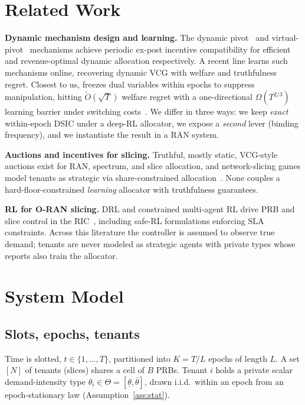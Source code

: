 \documentclass[conference]{IEEEtran}
\theoremstyle{definition}
\theoremstyle{remark}
\newcommand{\Slots}{T}
\newcommand{\Ep}{L}
\newcommand{\Neps}{K}
\newcommand{\Ntn}{N}
\newcommand{\type}{\theta}
\newcommand{\typesp}{\Theta}
\newcommand{\Otil}{\tilde{O}}
\begin{document}
\section{Related Work}\label{sec:related}
\textbf{Dynamic mechanism design and learning.} The dynamic pivot~\cite{ref:bergemann} and virtual-pivot~\cite{ref:kakade} mechanisms achieve periodic ex-post incentive compatibility for efficient and revenue-optimal dynamic allocation respectively. A recent line learns such mechanisms online, recovering dynamic VCG with welfare and truthfulness regret. Closest to us, \cite{ref:dai} freezes dual variables within epochs to suppress manipulation, hitting $\Otil(\sqrt{\Slots})$ welfare regret with a one-directional $\Omega(\Slots^{2/3})$ learning barrier under switching costs~\cite{ref:dekel}. We differ in three ways: we keep \emph{exact} within-epoch DSIC under a deep-RL allocator, we expose a \emph{second} lever (binding frequency), and we instantiate the result in a RAN system.

\textbf{Auctions and incentives for slicing.} Truthful, mostly static, VCG-style auctions exist for RAN, spectrum, and slice allocation, and network-slicing games model tenants as strategic via share-constrained allocation~\cite{ref:slicinggames}. None couples a hard-floor-constrained \emph{learning} allocator with truthfulness guarantees.

\textbf{RL for O-RAN slicing.} DRL and constrained multi-agent RL drive PRB and slice control in the RIC~\cite{ref:coloran,ref:slicing}, including safe-RL formulations enforcing SLA constraints. Across this literature the controller is assumed to observe true demand; tenants are never modeled as strategic agents with private types whose reports also train the allocator.

\section{System Model}\label{sec:model}

\subsection{Slots, epochs, tenants}
Time is slotted, $t\in\{1,\dots,\Slots\}$, partitioned into $\Neps=\Slots/\Ep$ epochs of length $\Ep$. A set $[\Ntn]$ of tenants (slices) shares a cell of $B$ PRBs. Tenant $i$ holds a private scalar demand-intensity type $\type_i\in\typesp=[\underline{\type},\bar{\type}]$, drawn i.i.d.\ within an epoch from an epoch-stationary law (Assumption~\ref{ass:stat}).
\end{document}
